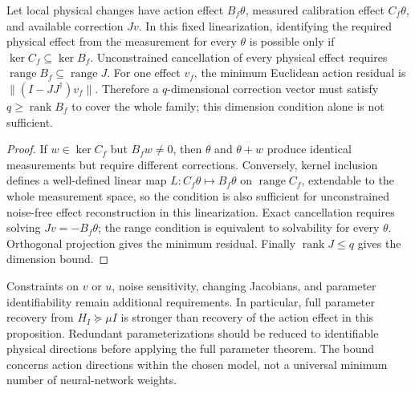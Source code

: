 \begin{proposition}
\label{prop:gen-identifiable-authority}
Let local physical changes have action effect $B_f\theta$, measured
calibration effect $C_f\theta$, and available correction $Jv$.
In this fixed linearization, identifying the required physical effect from
the measurement for every $\theta$ is possible only if
$\ker C_f\subseteq\ker B_f$.
Unconstrained cancellation of every physical effect requires
$\operatorname{range}B_f\subseteq\operatorname{range}J$.
For one effect $v_f$, the minimum Euclidean action residual is
$\|(I-JJ^\dagger)v_f\|$. Therefore a $q$-dimensional correction vector
must satisfy $q\ge\operatorname{rank}B_f$ to cover the whole family;
this dimension condition alone is not sufficient.
\end{proposition}
\begin{proof}
If $w\in\ker C_f$ but $B_fw\ne0$, then $\theta$ and $\theta+w$
produce identical measurements but require different corrections.
Conversely, kernel inclusion defines a well-defined linear map
$L:C_f\theta\mapsto B_f\theta$ on $\operatorname{range}C_f$, extendable
to the whole measurement space, so the condition is also sufficient for
unconstrained noise-free effect reconstruction in this linearization.
Exact cancellation requires solving $Jv=-B_f\theta$; the range condition
is equivalent to solvability for every $\theta$. Orthogonal projection
gives the minimum residual. Finally
$\operatorname{rank}J\le q$ gives the dimension bound.
\end{proof}
Constraints on $v$ or $u$, noise sensitivity, changing Jacobians, and
parameter identifiability remain additional requirements. In particular,
full parameter recovery from $H_I\succeq\mu I$ is stronger than recovery of
the action effect in this proposition. Redundant parameterizations should
be reduced to identifiable physical directions before applying the full
parameter theorem. The bound concerns action directions within the chosen
model, not a universal minimum number of neural-network weights.

